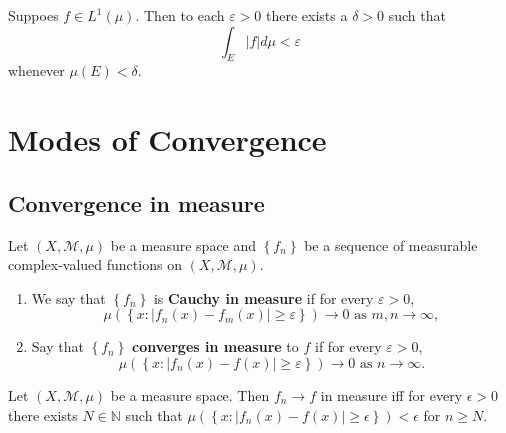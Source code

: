 \documentclass[12pt, a4paper, oneside]{book}
\begin{document}
\begin{theorem}
    Suppoes $f\in L^1(\mu)$. Then to each $\varepsilon > 0$ there exists a $\delta > 0$ such that
    \begin{equation*}
        \int_E \left|f\right|
        d\mu
        <
        \varepsilon
    \end{equation*}
    whenever $\mu(E)< \delta$.
\end{theorem}





\chapter{Modes of Convergence}



\section{Convergence in measure}
\begin{definition}
    Let $\left(X,\mathcal{M},\mu\right)$ be a measure space and $\left\{f_n\right\}$ be a sequence of measurable complex-valued functions on $\left(X, \mathcal{M}, \mu\right)$.
    \begin{enumerate}
        \item
              We say that $\left\{f_n\right\}$ is \textbf{Cauchy in measure} if for every $\varepsilon>0$,
              \begin{equation*}
                  \mu\left(\left\{x:\left|f_n(x)-f_m(x)\right| \geq \varepsilon\right\}\right) \rightarrow 0 \text { as } m, n \rightarrow \infty,
              \end{equation*}
        \item
              Say that $\left\{f_n\right\}$ \textbf{converges in measure} to $f$ if for every $\varepsilon>0$,
              \begin{equation*}
                  \mu\left(\left\{x:\left|f_n(x)-f(x)\right| \geq \varepsilon\right\}\right) \rightarrow 0 \text { as } n \rightarrow \infty .
              \end{equation*}
    \end{enumerate}
\end{definition}

\begin{theorem}
    Let $\left(X,\mathcal{M},\mu\right)$ be a measure space.
    Then $f_n \rightarrow f$ in measure iff for every $\epsilon>0$ there exists $N \in \mathbb{N}$ such that $\mu \left(\left\{ x: \left|f_n(x)-f(x)\right| \geq \epsilon\right\}\right)<\epsilon$ for $n \geq N$.
\end{theorem}
\end{document}
